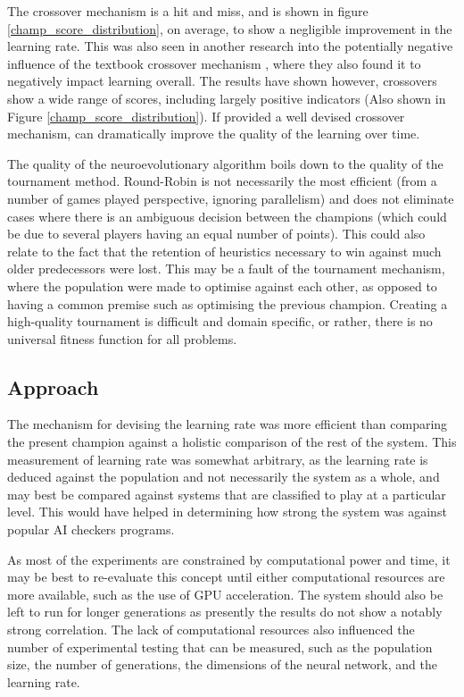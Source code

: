 \documentclass[12pt,a4paper]{article}
\begin{document}
    The crossover mechanism is a hit and miss, and is shown in figure \ref{champ_score_distribution}, on average, to show a negligible improvement in the learning rate. This was also seen in another research into the potentially negative influence of the textbook crossover mechanism \cite{emmanouilidis_comparison_2000}, where they also found it to negatively impact learning overall. The results have shown however, crossovers show a wide range of scores, including largely positive indicators (Also shown in Figure \ref{champ_score_distribution}). If provided a well devised crossover mechanism, can dramatically improve the quality of the learning over time.

    The quality of the neuroevolutionary algorithm boils down to the quality of the tournament method. Round-Robin is not necessarily the most efficient (from a number of games played perspective, ignoring  parallelism) and does not eliminate cases where there is an ambiguous decision between the champions (which could be due to several players having an equal number of points). This could also relate to the fact that the retention of heuristics necessary to win against much older predecessors were lost. This may be a fault of the tournament mechanism, where the population were made to optimise against each other, as opposed to having a common premise such as optimising the previous champion. Creating a high-quality tournament is difficult and domain specific, or rather, there is no universal fitness function for all problems.

    \subsection{Approach}
        The mechanism for devising the learning rate was more efficient than comparing the present champion against a holistic comparison of the rest of the system. This measurement of learning rate was somewhat arbitrary, as the learning rate is deduced against the population and not necessarily the system as a whole, and may best be compared against systems that are classified to play at a particular level. This would have helped in determining how strong the system was against popular AI checkers programs.

        As most of the experiments are constrained by computational power and time, it may be best to re-evaluate this concept until either computational resources are more available, such as the use of GPU acceleration. The system should also be left to run for longer generations as presently the results do not show a notably strong correlation. The lack of computational resources also influenced the number of experimental testing that can be measured, such as the population size, the number of generations, the dimensions of the neural network, and the learning rate.
        
\end{document}
